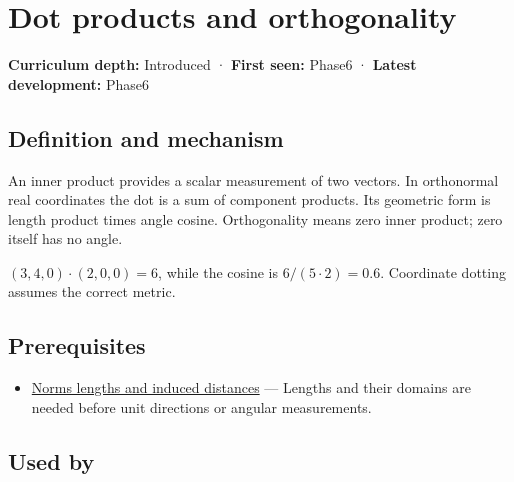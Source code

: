 \hypertarget{appendix-8bc4e8fc547c}{}
\section{Dot products and orthogonality}\label{appendix-8bc4e8fc547c-dot-products-and-orthogonality}

\textbf{Curriculum depth:} Introduced · \textbf{First seen:} Phase6 · \textbf{Latest development:} Phase6

\subsection{Definition and mechanism}\label{appendix-8bc4e8fc547c-definition-and-mechanism}

An inner product provides a scalar measurement of two vectors. In orthonormal real coordinates the dot is a sum of component products. Its geometric form is length product times angle cosine. Orthogonality means zero inner product; zero itself has no angle.

\((3,4,0)\cdot(2,0,0)=6\), while the cosine is \(6/(5\cdot2)=0.6\). Coordinate dotting assumes the correct metric.

\subsection{Prerequisites}\label{appendix-8bc4e8fc547c-prerequisites}

\begin{itemize}
\tightlist
\item
  \hyperref[appendix-49933872bb51]{Norms lengths and induced distances} --- Lengths and their domains are needed before unit directions or angular measurements.
\end{itemize}

\subsection{Used by}\label{appendix-8bc4e8fc547c-used-by}

